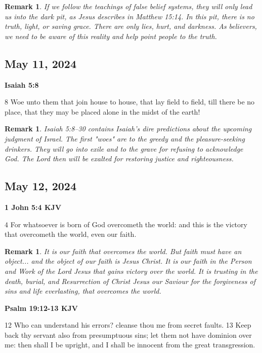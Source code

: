 \documentclass{article}
\newtheorem{remark}[theorem]{Remark}
\begin{document}
\begin{remark}
If we follow the teachings of false belief systems, they will only lead us
into the dark pit, as Jesus describes in Matthew 15:14. In this pit, there
is no truth, light, or saving grace. There are only lies, hurt, and
darkness. As believers, we need to be aware of this reality and help point
people to the truth.
\end{remark}

\bigskip

\subsection{May 11, 2024}

\textbf{Isaiah 5:8}

$8$ Woe unto them that join house to house, that lay field to field, till
there be no place, that they may be placed alone in the midst of the earth!

\begin{remark}
Isaiah 5:8--30 contains Isaiah's dire predictions about the upcoming
judgment of Israel. The first "woes" are to the greedy and the
pleasure-seeking drinkers. They will go into exile and to the grave for
refusing to acknowledge God. The Lord then will be exalted for restoring
justice and righteousness.
\end{remark}

\bigskip

\subsection{May 12, 2024}

\textbf{1 John 5:4 KJV}

$4$ For whatsoever is born of God overcometh the world: and this is the
victory that overcometh the world, even our faith.

\begin{remark}
It is our faith that overcomes the world. But faith must have an object...
and the object of our faith is Jesus Christ. It is our faith in the Person
and Work of the Lord Jesus that gains victory over the world. It is trusting
in the death, burial, and Resurrection of Christ Jesus our Saviour for the
forgiveness of sins and life everlasting, that overcomes the world.
\end{remark}

\textbf{Psalm 19:12-13 KJV}

12 Who can understand his errors? cleanse thou me from secret faults. 13
Keep back thy servant also from presumptuous sins; let them not have
dominion over me: then shall I be upright, and I shall be innocent from the
great transgression.
\end{document}
